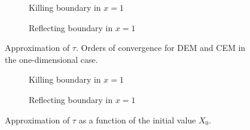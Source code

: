 \begin{figure}[t]
    \centering
    \begin{subfigure}{0.49\linewidth}
        \centering
        \resizebox{1\linewidth}{!}{ }  
        \caption{Killing boundary in $x = 1$}
        \label{fig:KillOneD}
    \end{subfigure}
    \begin{subfigure}{0.49\linewidth}
        \centering
        \resizebox{1\linewidth}{!}{ }  
        \caption{Reflecting boundary in $x = 1$}
        \label{fig:ReflectOneD}
    \end{subfigure}    
    \caption{Approximation of $\tau$. Orders of convergence for DEM and CEM in the one-dimensional case.}
    \label{fig:OrdersOneD}
\end{figure}

\begin{figure}[t]
    \centering
    \begin{subfigure}{0.49\linewidth}
        \centering
        \resizebox{1\linewidth}{!}{ }  
        \caption{Killing boundary in $x = 1$}
        \label{fig:ApproxOneD}
    \end{subfigure}
    \begin{subfigure}{0.49\linewidth}
        \centering
        \resizebox{1\linewidth}{!}{ }  
        \caption{Reflecting boundary in $x = 1$}
        \label{fig:ApproxOneD}
    \end{subfigure}    
    \caption{Approximation of $\tau$ as a function of the initial value $X_0$.}
    \label{fig:ApproxOneD}
\end{figure}
